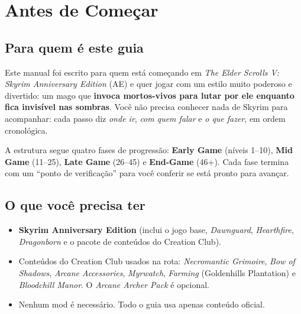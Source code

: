\documentclass[11pt,a4paper,oneside,openany]{book}
\newcommand{\objeto}[1]{\textit{\textcolor{NecroEmerald}{#1}}}
\begin{document}
\begingroup\renewcommand{\contentsname}{Sumário}
\tableofcontents
\endgroup
\clearpage
{}

\chapter{Antes de Começar}

\section{Para quem é este guia}
Este manual foi escrito para quem está começando em \emph{The Elder Scrolls V: Skyrim Anniversary Edition} (AE) e quer jogar com um estilo muito poderoso e divertido: um mago que \textbf{invoca mortos-vivos para lutar por ele enquanto fica invisível nas sombras}. Você não precisa conhecer nada de Skyrim para acompanhar: cada passo diz \emph{onde ir}, \emph{com quem falar} e \emph{o que fazer}, em ordem cronológica.

A estrutura segue quatro fases de progressão: \textbf{Early Game} (níveis 1--10), \textbf{Mid Game} (11--25), \textbf{Late Game} (26--45) e \textbf{End-Game} (46+). Cada fase termina com um ``ponto de verificação'' para você conferir se está pronto para avançar.

\section{O que você precisa ter}
\begin{itemize}
  \item \textbf{Skyrim Anniversary Edition} (inclui o jogo base, \emph{Dawnguard}, \emph{Hearthfire}, \emph{Dragonborn} e o pacote de conteúdos do Creation Club).
  \item Conteúdos do Creation Club usados na rota: \objeto{Necromantic Grimoire}, \objeto{Bow of Shadows}, \objeto{Arcane Accessories}, \objeto{Myrwatch}, \objeto{Farming} (Goldenhills Plantation) e \objeto{Bloodchill Manor}. O \objeto{Arcane Archer Pack} é opcional.
  \item Nenhum mod é necessário. Todo o guia usa apenas conteúdo oficial.
\end{itemize}
\end{document}
